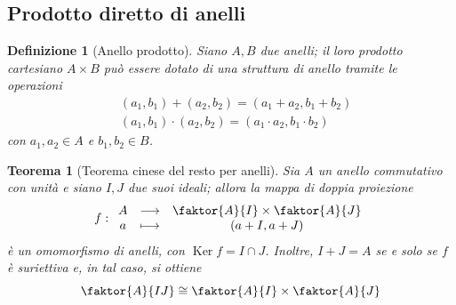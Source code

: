 \documentclass[11pt]{article}
\theoremstyle{style}
\newtheorem{definizione}{Definizione}[section]
\newtheorem{teorema}{Teorema}[section]
\numberwithin{equation}{subsection}
\begin{document}
\subsection{Prodotto diretto di anelli}
\begin{definizione}
	[Anello prodotto]
	Siano $A,B$ due anelli; il loro prodotto cartesiano $A\times B$ pu\`o essere dotato di una struttura di anello tramite le operazioni
	\[
	\begin{split}
		&(a_1,b_1)+(a_2,b_2) = (a_1+a_2,b_1+b_2) \\
		& (a_1,b_1) \cdot (a_2,b_2) = (a_1\cdot a_2, b_1\cdot b_2)
	\end{split}
	\] 
	con $a_1,a_2\in A$ e $b_1,b_2 \in B$.
\end{definizione}
\begin{teorema}
	[Teorema cinese del resto per anelli]
	Sia $A$ un anello commutativo con unit\`a e siano $I,J$ due suoi ideali; allora la mappa di doppia proiezione
	\[
	f :
	\begin{array}
		{c c c}
		A&\longrightarrow & \faktor{A}{I} \times \faktor{A}{J}\\
		a&\longmapsto &(a+I,a+J)
	\end{array}
	\] 
	\`e un omomorfismo di anelli, con $\operatorname{Ker} f = I\cap J$.
	Inoltre, $I+J = A$ se e solo se $f$ \`e suriettiva e, in tal caso, si ottiene
	\[
		\faktor{A}{IJ} \cong \faktor{A}{I} \times \faktor{A}{J}
	\] 
\end{teorema}
\end{document}
